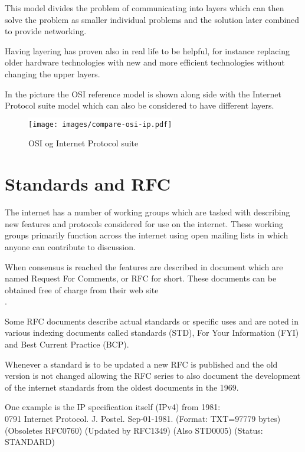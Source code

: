 \documentclass[a4paper,11pt,notitlepage]{report}
\begin{document}
This model divides the problem of communicating into layers which can
then solve the problem as smaller individual problems and the solution
later combined to provide networking.

Having layering has proven also in real life to be helpful, for instance
replacing older hardware technologies with new and more efficient technologies
without changing the upper layers.

In the picture the OSI reference model is shown along side with
the Internet Protocol suite model which can also be considered to have different layers.


\begin{figure}[H]
\label{fig:osi}
\begin{center}
\colorbox{white}{\texttt{[image: images/compare-osi-ip.pdf]}}
\end{center}
\caption{OSI og Internet Protocol suite}
\end{figure}


\section*{\color{titlecolor}Standards and RFC}

The internet has a number of working groups which are tasked with describing
new features and protocols considered for use on the internet. These
working groups primarily function across the internet using open mailing lists
in which anyone can contribute to discussion.

When consensus is reached the features are described in document which
are named Request For Comments, or RFC for short. These documents can
be obtained free of charge from their web site\\ .

Some RFC documents describe actual standards or specific uses and are noted in various
indexing documents called standards (STD), For Your Information (FYI) and Best
Current Practice (BCP).

Whenever a standard is to be updated a new RFC is published and the old version
is not changed allowing the RFC series to also document the development of
the internet standards from the oldest documents in the 1969.

One example is the IP specification itself (IPv4) from 1981:\\
0791 Internet Protocol. J. Postel. Sep-01-1981. (Format: TXT=97779
bytes) (Obsoletes RFC0760) (Updated by RFC1349) (Also STD0005)
(Status: STANDARD)
\end{document}
